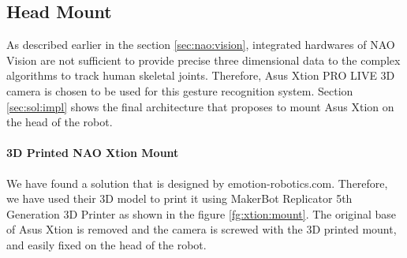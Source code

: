 \subsection{Head Mount} As described earlier in the section \ref{sec:nao:vision}, integrated hardwares of NAO Vision are not sufficient to provide precise three dimensional data to the complex algorithms to track human skeletal joints. Therefore, Asus Xtion PRO LIVE 3D camera is chosen to be used for this gesture recognition system. Section \ref{sec:sol:impl} shows the final architecture that proposes to mount Asus Xtion on the head of the robot. 



\paragraph*{3D Printed NAO Xtion Mount} We have found a solution that is designed by emotion-robotics.com. Therefore, we have used their 3D model to print it using MakerBot Replicator 5th Generation 3D Printer as shown in the figure \ref{fg:xtion:mount}. The original base of Asus Xtion is removed and the camera is screwed with the 3D printed mount, and easily fixed on the head of the robot. 
